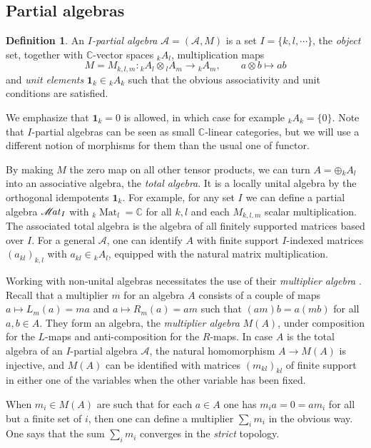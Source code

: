 \documentclass[10pt]{article}
\DeclareMathOperator{\Mat}{\mathscr{M}\!\it{at}}
\DeclareMathOperator{\Matt}{\mathrm{Mat}}
\newcommand{\C}{\mathbb{C}}
\newcommand{\GrDA}[3]{{}_{#2}#1_{#3}} %
\newcommand{\Unit}{\mathbf{1}}
\theoremstyle{definition}
\newtheorem{Def}[Theorem]{Definition}
\numberwithin{equation}{section}
\begin{document}
\subsection{Partial algebras}

\begin{Def} An \emph{$I$-partial algebra} $\mathscr{A}=(\mathscr{A},M)$ is a set $I=\{k,l,\cdots\}$, the \emph{object} set, together with $\C$-vector spaces $\GrDA{A}{k}{l}$, multiplication maps \[M=M_{k,l,m}:\GrDA{A}{k}{l} \otimes \GrDA{A}{l}{m}\rightarrow \GrDA{A}{k}{m},\qquad a\otimes b \mapsto ab\]  and \emph{unit elements} $\Unit_k \in \GrDA{A}{k}{k}$ such that the obvious associativity and unit conditions are satisfied. 
\end{Def}

We emphasize that $\Unit_k=0$ is allowed, in which case for example $\GrDA{A}{k}{k}=\{0\}$. Note that $I$-partial algebras can be seen as small $\C$-linear categories, but we will use a different notion of morphisms for them than the usual one of functor.

By making $M$ the zero map on all other tensor products, we can turn $A =  \oplus\GrDA{A}{k}{l}$ into an associative algebra, the \emph{total algebra}.  It is a locally unital algebra by the orthogonal idempotents $\mathbf{1}_k$. For example, for any set $I$ we can define a partial algebra $\Mat_I$ with $\GrDA{\Matt}{k}{l} = \C$ for all $k,l$ and each $M_{k,l,m}$ scalar multiplication. The associated total algebra is the algebra of all finitely supported matrices based over $I$. For a general $\mathscr{A}$, one can identify $A$ with finite support $I$-indexed matrices $(a_{kl})_{k,l}$ with $a_{kl} \in \GrDA{A}{k}{l}$, equipped with the natural matrix multiplication. 

Working with non-unital algebras necessitates the use of their \emph{multiplier algebra} \cite{Dau1,VDae1}. Recall that a multiplier $m$ for an algebra $A$ consists of a couple of maps $a \mapsto L_m(a)=ma$ and $a\mapsto R_m(a)=am$ such that $(am)b = a(mb)$ for all $a,b\in A$. They form an algebra, the \emph{multiplier algebra} $M(A)$, under composition for the $L$-maps and anti-composition for the $R$-maps. In case $A$ is the total algebra of an $I$-partial algebra $\mathscr{A}$, the natural homomorphism $A\rightarrow M(A)$ is injective, and $M(A)$ can be identified with matrices $(m_{kl})_{kl}$ of finite support in either one of the variables when the other variable has been fixed. 

When $m_i\in M(A)$ are such that for each $a\in A$ one has $m_ia =0=am_i$ for all but a finite set of $i$, then one can define a multiplier $\sum_i m_i$ in the obvious way. One says that the sum $\sum_i m_i$ converges in the \emph{strict} topology. 
 
\end{document}
